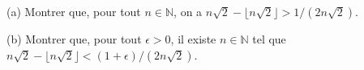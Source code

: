 (a) Montrer que, pour tout $n \in \mathbb{N}$, on a $n\sqrt{2} - \lfloor n\sqrt{2} \rfloor > 1/(2n\sqrt{2})$.

(b) Montrer que, pour tout $\epsilon > 0$, il existe $n \in \mathbb{N}$ tel que $n\sqrt{2} - \lfloor n\sqrt{2} \rfloor < (1 + \epsilon)/(2n\sqrt{2})$.
